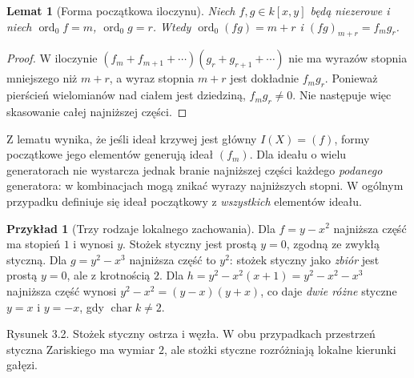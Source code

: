 \documentclass[11pt,a4paper,openany]{report}
\numberwithin{equation}{section}
\theoremstyle{plain}
\newtheorem{lemat}[twierdzenie]{Lemat}
\theoremstyle{definition}
\newtheorem{przyklad}[twierdzenie]{Przykład}
\theoremstyle{remark}
\begin{document}
\begin{lemat}[Forma początkowa iloczynu]
Niech $f,g\in k[x,y]$ będą niezerowe i niech
$\operatorname{ord}_0f=m$, $\operatorname{ord}_0g=r$.
Wtedy $\operatorname{ord}_0(fg)=m+r$ i
$(fg)_{m+r}=f_mg_r$.
\end{lemat}
\begin{proof}
W iloczynie $(f_m+f_{m+1}+\cdots)(g_r+g_{r+1}+\cdots)$
nie ma wyrazów stopnia mniejszego niż $m+r$,
a wyraz stopnia $m+r$ jest dokładnie $f_mg_r$.
Ponieważ pierścień wielomianów nad ciałem jest dziedziną,
$f_mg_r\ne0$. Nie następuje więc skasowanie całej
najniższej części.
\end{proof}

Z lematu wynika, że jeśli ideał krzywej jest główny
$I(X)=(f)$, formy początkowe jego elementów generują
ideał $(f_m)$. Dla ideału o wielu generatorach nie wystarcza
jednak branie najniższej części każdego \emph{podanego}
generatora: w kombinacjach mogą znikać wyrazy najniższych
stopni. W ogólnym przypadku definiuje się ideał początkowy
z \emph{wszystkich} elementów ideału.

\begin{przyklad}[Trzy rodzaje lokalnego zachowania]
Dla $f=y-x^2$ najniższa część ma stopień $1$ i wynosi $y$.
Stożek styczny jest prostą $y=0$, zgodną ze zwykłą styczną.
Dla $g=y^2-x^3$ najniższa część to $y^2$:
stożek styczny jako \emph{zbiór} jest prostą $y=0$,
ale z krotnością $2$. Dla
$h=y^2-x^2(x+1)=y^2-x^2-x^3$ najniższa część
wynosi $y^2-x^2=(y-x)(y+x)$, co daje
\emph{dwie różne} styczne $y=x$ i $y=-x$,
gdy $\operatorname{char}k\ne2$.
\end{przyklad}

\begin{center}

\small Rysunek 3.2. Stożek styczny ostrza i węzła. W obu przypadkach
przestrzeń styczna Zariskiego ma wymiar $2$, ale stożki styczne
rozróżniają lokalne kierunki gałęzi.
\end{center}
\end{document}
